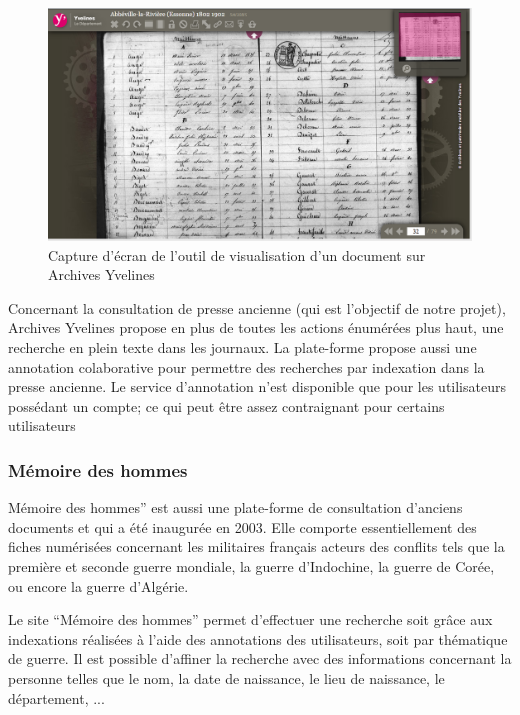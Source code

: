         \begin{figure}[ht!]
            \centering
            \includegraphics[width=1\textwidth]{figure/screen_yvelines_document.png}
            \caption{Capture d'écran de l'outil de visualisation d'un document sur Archives Yvelines}
            \label{fig:yvelines_doc}
        \end{figure}

        Concernant la consultation de presse ancienne (qui est l’objectif de notre projet),
        Archives Yvelines propose en plus de toutes les actions énumérées plus haut, une recherche
        en plein texte dans les journaux. La plate-forme propose aussi une annotation colaborative
        pour permettre des recherches par indexation dans la presse ancienne. Le service d’annotation
        n’est disponible que pour les utilisateurs possédant un compte; ce qui peut être assez contraignant
        pour certains utilisateurs

        \subsubsection{Mémoire des hommes}
        \label{subsubsec:memoire}
        Mémoire des hommes” est aussi une plate-forme de consultation d’anciens documents
        et qui a été inaugurée en 2003. Elle comporte essentiellement des fiches numérisées concernant
        les militaires français acteurs des conflits tels que la première et seconde guerre mondiale,
        la guerre d’Indochine, la guerre de Corée, ou encore la guerre d’Algérie.

        Le site “Mémoire des hommes” permet d’effectuer une recherche soit grâce aux indexations
        réalisées à l’aide des annotations des utilisateurs, soit par thématique de guerre.
        Il est possible d’affiner la recherche avec des informations concernant la personne telles que le nom,
        la date de naissance, le lieu de naissance, le département, ...

